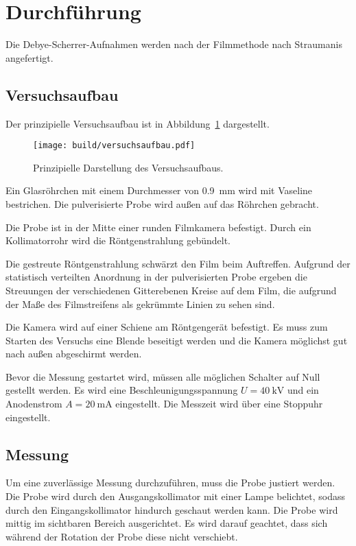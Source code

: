 \section{Durchführung}%
\label{sec:Durchführung}
Die Debye-Scherrer-Aufnahmen werden nach der Filmmethode nach Straumanis angefertigt.

\subsection{Versuchsaufbau}%
\label{sub:versuchsaufbau}
Der prinzipielle Versuchsaufbau ist in Abbildung~\ref{fig:versuchsaufbau} dargestellt.
\begin{figure}
  \centering
  \texttt{[image: build/versuchsaufbau.pdf]}
  \caption{Prinzipielle Darstellung des Versuchsaufbaus.\cite{anleitung}}%
  \label{fig:versuchsaufbau}
\end{figure}

Ein Glasröhrchen mit einem Durchmesser von \SI{0.9}{\milli\meter} wird mit Vaseline bestrichen.
Die pulverisierte Probe wird außen auf das Röhrchen gebracht.

Die Probe ist in der Mitte einer runden Filmkamera befestigt.
Durch ein Kollimatorrohr wird die Röntgenstrahlung gebündelt.

Die gestreute Röntgenstrahlung schwärzt den Film beim Auftreffen.
Aufgrund der statistisch verteilten Anordnung in der pulverisierten Probe
ergeben die Streuungen der verschiedenen Gitterebenen Kreise auf dem Film,
die aufgrund der Maße des Filmstreifens als gekrümmte Linien zu sehen sind.

Die Kamera wird auf einer Schiene am Röntgengerät befestigt.
Es muss zum Starten des Versuchs eine Blende beseitigt werden und die Kamera
möglichst gut nach außen abgeschirmt werden.

Bevor die Messung gestartet wird, müssen alle möglichen Schalter auf Null gestellt werden.
Es wird eine Beschleunigungsspannung $U = \SI{40}{\kilo\volt}$ und ein
Anodenstrom $A = \SI{20}{\milli\ampere}$ eingestellt.
Die Messzeit wird über eine Stoppuhr eingestellt.


\subsection{Messung}%
\label{sub:messung}
Um eine zuverlässige Messung durchzuführen, muss die Probe justiert werden.
Die Probe wird durch den Ausgangskollimator mit einer Lampe belichtet,
sodass durch den Eingangskollimator hindurch geschaut werden kann.
Die Probe wird mittig im sichtbaren Bereich ausgerichtet.
Es wird darauf geachtet, dass sich während der Rotation der Probe diese nicht verschiebt.

